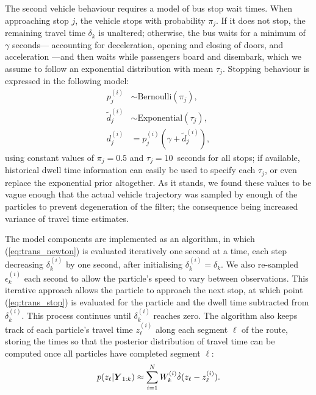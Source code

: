 The second vehicle behaviour requires a model of bus stop wait times.
When approaching stop $j$,
the vehicle stops with probability $\pi_j$.
If it does not stop, the remaining travel time $\delta_k$ is unaltered;
otherwise, the bus waits for a minimum of $\gamma$ seconds---%
accounting for deceleration, opening and closing of doors, and acceleration
\citep{Hans_2015}---and then waits while passengers board and disembark,
which we assume to follow an exponential distribution with mean $\tau_j$.
Stopping behaviour is expressed in the following model:
\begin{equation}
\label{eq:trans_stop}
\begin{split}
p_j^{(i)} &\sim \mathrm{Bernoulli}(\pi_j), \\
\tilde d_j^{(i)} &\sim \mathrm{Exponential}(\tau_j), \\
d_j^{(i)} &= p_j^{(i)}(\gamma + \tilde d_j^{(i)}),
\end{split}
\end{equation}
using constant values of $\pi_j = 0.5$ and $\tau_j = 10$~seconds for all stops;
if available, historical dwell time information can easily be used
to specify each $\tau_j$,
or even replace the exponential prior altogether.
As it stands, we found these values to be vague enough that
the actual vehicle trajectory was sampled by enough of the particles
to prevent degeneration of the filter;
the consequence being increased variance of travel time estimates.


The model components are implemented as an algorithm,
in which (\ref{eq:trans_newton}) is evaluated iteratively one second at a time,
each step decreasing $\delta_k^{(i)}$ by one second,
after initialising $\delta_k^{(i)} = \delta_k$.
We also re-sampled
$\epsilon_k^{(i)}$ each second
to allow the particle's speed to vary between observations.
This iterative approach allows the particle to approach the next stop,
at which point (\ref{eq:trans_stop}) is evaluated for the particle
and the dwell time subtracted from $\delta_k^{(i)}$.
This process continues until $\delta_k^{(i)}$ reaches zero.
The algorithm also keeps track of each particle's travel time $z_\ell^{(i)}$
along each segment $\ell$ of the route,
storing the times so that the posterior distribution of travel time
can be computed once all particles have completed segment $\ell$:
\begin{equation}
\label{eq:post_tt}
p(z_\ell | \mbox{$\boldsymbol{Y}$}_{1:k}) \approx
    \sum_{i=1}^N W_k^{(i)} \dot\delta(z_\ell - z_\ell^{(i)}).
\end{equation}




